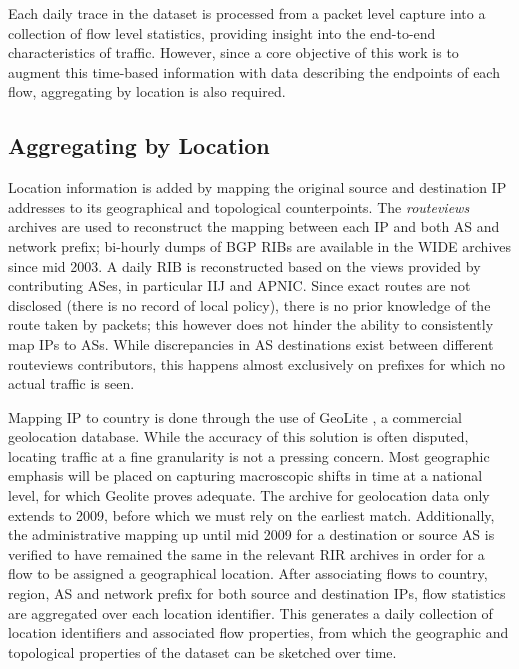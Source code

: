 Each daily trace in the dataset is processed from a packet level capture into a collection of flow level statistics, providing insight into the end-to-end characteristics of traffic. 
However, since a core objective of this work is to augment this time-based information with data describing the endpoints of each flow, aggregating by location is also required. 

\subsection{Aggregating by Location}

Location information is added by mapping the original source and destination \ac{IP} addresses to its geographical and topological counterpoints. 
The \emph{routeviews} archives are used to reconstruct the mapping between each \ac{IP} and both \ac{AS} and network prefix; bi-hourly dumps of \ac{BGP} \acp{RIB} are available in the \ac{WIDE} archives since mid 2003. 
A daily \ac{RIB} is reconstructed based on the views provided by contributing ASes, in particular \ac{IIJ} and \ac{APNIC}.
Since exact routes are not disclosed (there is no record of local policy), there is no prior knowledge of the route taken by packets; this however does not hinder the ability to consistently map \acp{IP} to {\COMMENT\acp{AS}}.
While discrepancies in \ac{AS} destinations exist between different routeviews contributors, this happens almost exclusively on prefixes for which no actual traffic is seen. 

Mapping \ac{IP} to country is done through the use of GeoLite \cite{maxmind}, a commercial geolocation database. 
While the accuracy of this solution is often disputed, locating traffic at a fine granularity is not a pressing concern.
Most geographic emphasis will be placed on capturing macroscopic shifts in time at a national level, for which Geolite proves adequate.
The archive for geolocation data only extends to 2009, before which we must rely on the earliest match. 
Additionally, the administrative mapping up until mid 2009 for a destination or source \ac{AS} is verified to have remained the same in the relevant \ac{RIR} archives in order for a flow to be assigned a geographical location.
After associating flows to country, region, \ac{AS} and network prefix for both source and destination \acp{IP}, flow statistics are aggregated over each location identifier. 
This generates a daily collection of location identifiers and associated flow properties, from which the geographic and topological properties of the dataset can be sketched over time.
